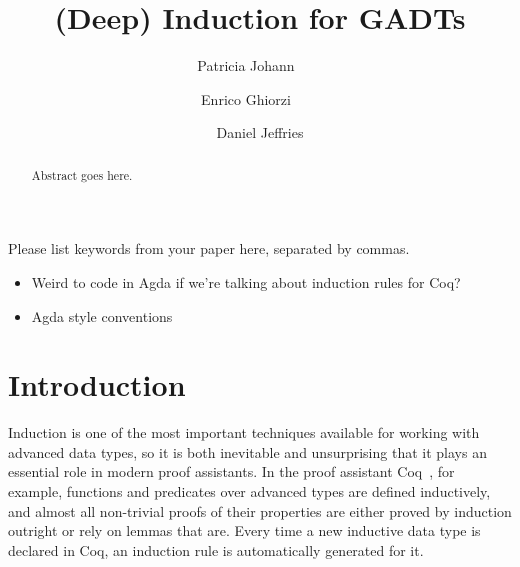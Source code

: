 \documentclass[9pt]{entcs}
\begin{document}
\begin{frontmatter}
  \title{(Deep) Induction for GADTs}

  \author{Patricia Johann~~~~}%
  \author{Enrico Ghiorzi~~~~}%
  \author{Daniel Jeffries}%
  \address{$\mathtt{\{johannp,ghiorzie,jeffriesd\}@appstate.edu}$\\Department of Computer Science, Appalachian State University}

\begin{abstract} 
  Abstract goes here.
\end{abstract}

\begin{keyword}
  Please list keywords from your paper here, separated by commas.
\end{keyword}

\end{frontmatter}

\begin{itemize}
\item Weird to code in Agda if we're talking about induction rules for
  Coq? 
\item Agda style conventions
\end{itemize}
  
\section{Introduction}\label{sec:intro}

Induction is one of the most important techniques available for
working with advanced data types, so it is both inevitable and
unsurprising that it plays an essential role in modern proof
assistants. In the proof assistant Coq~\cite{coq20}, for example,
functions and predicates over advanced types are defined inductively,
and almost all non-trivial proofs of their properties are either
proved by induction outright or rely on lemmas that are. Every time a
new inductive data type is declared in Coq, an induction rule is
automatically generated for it.
\end{document}
